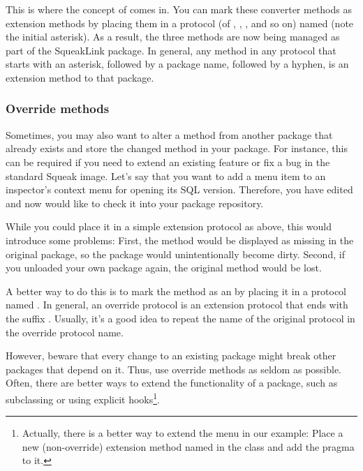 \documentclass[a4paper,10pt,twoside]{book}
\begin{document}
This is where the concept of  comes in.
You can mark these converter methods as extension methods by placing them in a protocol (of , , , and so on) named  (note the initial asterisk).
As a result, the three methods are now being managed as part of the SqueakLink package.
In general, any method in any protocol that starts with an asterisk, followed by a package name, followed by a hyphen, is an extension method to that package.

\subsubsection{Override methods}

Sometimes, you may also want to alter a method from another package that already exists and store the changed method in your package.
For instance, this can be required if you need to extend an existing feature or fix a bug in the standard Squeak image.
Let's say that you want to add a menu item to an inspector's context menu for opening its SQL version.
Therefore, you have edited  and now would like to check it into your package repository.

While you could place it in a simple extension protocol as above, this would introduce some problems:
First, the method would be displayed as missing in the original package, so the package would unintentionally become dirty.
Second, if you unloaded your own package again, the original method would be lost.

A better way to do this is to mark the method as an  by placing it in a protocol named .
In general, an override protocol is an extension protocol that ends with the suffix .
Usually, it's a good idea to repeat the name of the original protocol in the override protocol name.

However, beware that every change to an existing package might break other packages that depend on it.
Thus, use override methods as seldom as possible.
Often, there are better ways to extend the functionality of a package, such as subclassing or using explicit hooks\footnote{Actually, there is a better way to extend the menu in our example: Place a new (non-override) extension method named  in the  class and add the pragma  to it.}.
\end{document}
